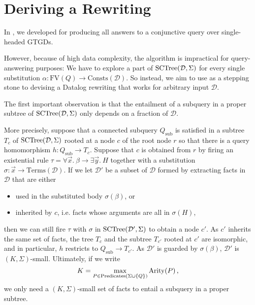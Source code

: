 \documentclass[12pt]{report}
\theoremstyle{plain}
\theoremstyle{definition}
\def\FV{{\mathrm{FV}}}
\def\Consts{{\mathrm{Consts}}}
\def\Terms{{\mathrm{Terms}}}
\def\Predicates{{\mathrm{Predicates}}}
\newcommand{\Arity}[1]{\ensuremath{\normalfont{\operatorname{Arity}}\!\left( #1 \right)}}
\newcommand{\SCTree}[2]{\ensuremath{\normalfont{\textrm{SCTree}}\!\left( #1, #2 \right)}}
\begin{document}
\newpage
\chapter{Deriving a Rewriting}
\label{chapter:deriving-a-rewriting}

In , we developed  for producing all answers to a conjunctive query over single-headed GTGDs.

However, because of high data complexity, the algorithm is impractical for query-answering purposes: We have to explore a part of $\SCTree{\mathcal{D}}{\Sigma}$ for every single substitution $\alpha: \FV(Q) \rightarrow \Consts(\mathcal{D})$. So instead, we aim to use  as a stepping stone to devising a Datalog rewriting that works for arbitrary input $\mathcal{D}$.

The first important observation is that the entailment of a subquery in a proper subtree of $\SCTree{\mathcal{D}}{\Sigma}$ only depends on a fraction of $\mathcal{D}$.

More precisely, suppose that a connected subquery $Q_\mathrm{sub}$ is satisfied in a subtree $T_c$ of $\SCTree{\mathcal{D}}{\Sigma}$ rooted at a node $c$ of the root node $r$ so that there is a query homomorphism $h: Q_\mathrm{sub} \rightarrow T_c$. Suppose that $c$ is obtained from $r$ by firing an existential rule $\tau = \forall \vec{x}.\ \beta \rightarrow \exists \vec{y}.\ H$ together with a substitution $\sigma: \vec{x} \rightarrow \Terms(\mathcal{D})$. If we let $\mathcal{D'}$ be a subset of $\mathcal{D}$ formed by extracting facts in $\mathcal{D}$ that are either
\begin{itemize}
  \item used in the substituted body $\sigma(\beta)$, or
  \item inherited by $c$, i.e. facts whose arguments are all in $\sigma(H)$,
\end{itemize}
then we can still fire $\tau$ with $\sigma$ in $\SCTree{\mathcal{D'}}{\Sigma}$ to obtain a node $c'$. As $c'$ inherits the same set of facts, the tree $T_c$ and the subtree $T_{c'}$ rooted at $c'$ are isomorphic, and in particular, $h$ restricts to $Q_\mathrm{sub} \rightarrow T_{c'}$. As $\mathcal{D'}$ is guarded by $\sigma(\beta)$, $\mathcal{D'}$ is $(K, \Sigma)$-small. Ultimately, if we write $$K = \max_{P \in \Predicates(\Sigma \cup \{Q\})} \Arity{P},$$we only need a $(K, \Sigma)$-small set of facts to entail a subquery in a proper subtree.
\end{document}
